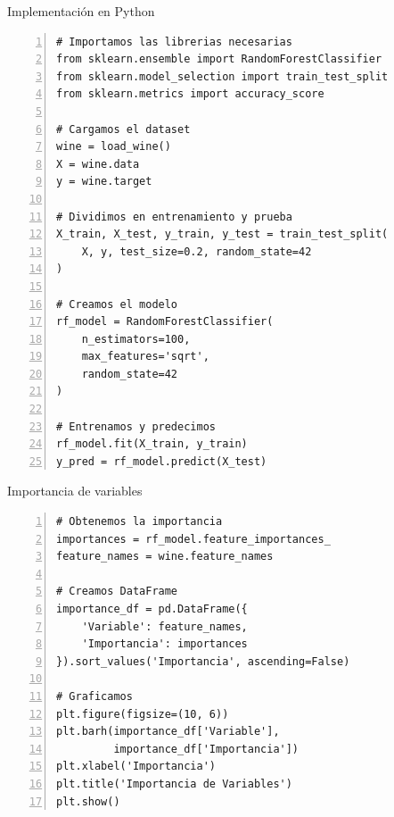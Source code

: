 \documentclass{beamer}
\begin{document}
\begin{frame}[fragile]{Implementación en Python}
    \begin{lstlisting}[numbers=left, numbersep=5pt]
# Importamos las librerias necesarias
from sklearn.ensemble import RandomForestClassifier
from sklearn.model_selection import train_test_split
from sklearn.metrics import accuracy_score

# Cargamos el dataset
wine = load_wine()
X = wine.data
y = wine.target

# Dividimos en entrenamiento y prueba
X_train, X_test, y_train, y_test = train_test_split(
    X, y, test_size=0.2, random_state=42
)

# Creamos el modelo
rf_model = RandomForestClassifier(
    n_estimators=100,
    max_features='sqrt',
    random_state=42
)

# Entrenamos y predecimos
rf_model.fit(X_train, y_train)
y_pred = rf_model.predict(X_test)
    \end{lstlisting}
\end{frame}

\begin{frame}[fragile]{Importancia de variables}
    \begin{lstlisting}[numbers=left, numbersep=5pt]
# Obtenemos la importancia
importances = rf_model.feature_importances_
feature_names = wine.feature_names

# Creamos DataFrame
importance_df = pd.DataFrame({
    'Variable': feature_names,
    'Importancia': importances
}).sort_values('Importancia', ascending=False)

# Graficamos
plt.figure(figsize=(10, 6))
plt.barh(importance_df['Variable'], 
         importance_df['Importancia'])
plt.xlabel('Importancia')
plt.title('Importancia de Variables')
plt.show()
    \end{lstlisting}
\end{frame}
\end{document}
